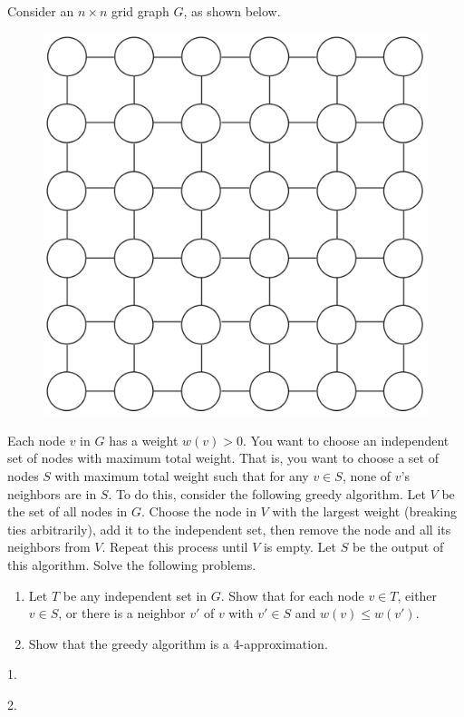 \problem{}
Consider an $n \times n$ grid graph $G$, as shown below.

\begin{figure}[h]
    \centering
    \includegraphics[width=0.4\linewidth]{media/p4.png}
\end{figure}

Each node $v$ in $G$ has a weight $w(v) > 0$.  You want to choose an independent set of nodes with maximum total weight.  That is, you want to choose a set of nodes $S$ with maximum total weight such that for any $v \in S$, none of $v$'s neighbors are in $S$.  To do this, consider the following greedy algorithm.  Let $V$ be the set of all nodes in $G$.  Choose the node in $V$ with the largest weight (breaking ties arbitrarily), add it to the independent set, then remove the node and all its neighbors from $V$.  Repeat this process until $V$ is empty.  Let $S$ be the output of this algorithm.   Solve the following problems.

\begin{enumerate}
\item Let $T$ be any independent set in $G$.  Show that for each node $v \in T$, either $v \in S$, or there is a neighbor $v'$ of $v$ with $v' \in S$ and $w(v) \leq w(v')$.
\item Show that the greedy algorithm is a 4-approximation.
\end{enumerate}


\vspace{5mm}

\solution{}
1.







2.







